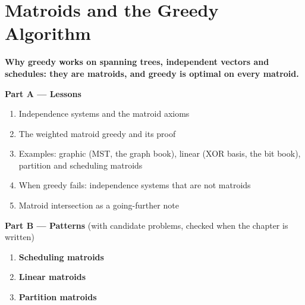 \chapter{Matroids and the Greedy Algorithm}
\label{ch:matroids}

\begin{tcolorbox}[enhanced, colback=white, colframe=secondaryblue, boxrule=1pt, arc=2mm]
\textbf{\large\textcolor{primaryblue}{Why greedy works on spanning trees, independent vectors and schedules: they are matroids, and greedy is optimal on every matroid.}}
\end{tcolorbox}


\begin{plannedbox}
\textbf{Part A --- Lessons}
\begin{enumerate}[leftmargin=*, label=\textbf{A\arabic*.}, itemsep=1pt]
    \item Independence systems and the matroid axioms
    \item The weighted matroid greedy and its proof
    \item Examples: graphic (MST, the graph book), linear (XOR basis, the bit book), partition and scheduling matroids
    \item When greedy fails: independence systems that are not matroids
    \item Matroid intersection as a going-further note
\end{enumerate}
\textbf{Part B --- Patterns} (with candidate problems, checked when the chapter is written)
\begin{enumerate}[leftmargin=*, label=\textbf{P\arabic*.}, itemsep=1pt]
    \item \textbf{Scheduling matroids}
    \item \textbf{Linear matroids}
    \item \textbf{Partition matroids}
\end{enumerate}
\end{plannedbox}
